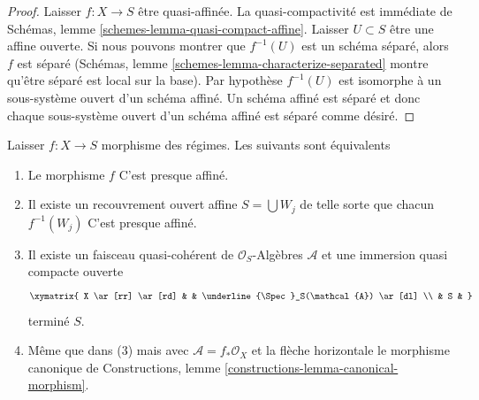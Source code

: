 \begin{proof}
Laisser $f : X \to S$ être quasi-affinée. La quasi-compactivité est immédiate de Schémas, lemme \ref{schemes-lemma-quasi-compact-affine}. Laisser $U \subset S$ être une affine ouverte. Si nous pouvons montrer que $f^{-1}(U)$ est un schéma séparé, alors $f$ est séparé (Schémas, lemme \ref{schemes-lemma-characterize-separated} montre qu'être séparé est local sur la base). Par hypothèse $f^{-1}(U)$ est isomorphe à un sous-système ouvert d'un schéma affiné. Un schéma affiné est séparé et donc chaque sous-système ouvert d'un schéma affiné est séparé comme désiré.
\end{proof}

\begin{lemma}

\label{lemma-characterize-quasi-affine}

Laisser $f : X \to S$ morphisme des régimes. Les suivants sont équivalents

\begin{enumerate}

\item Le morphisme $f$ C'est presque affiné.
\item Il existe un recouvrement ouvert affine $S = \bigcup W_j$
de telle sorte que chacun $f^{-1}(W_j)$ C'est presque affiné.
\item Il existe un faisceau quasi-cohérent de $\mathcal{O}_S$-Algèbres
$\mathcal{A}$ et une immersion quasi compacte ouverte
$$
\xymatrix{
X \ar[rr] \ar[rd] & & \underline{\Spec}_S(\mathcal{A}) \ar[dl] \\
& S &
}
$$
terminé $S$.
\item Même que dans (3) mais avec $\mathcal{A} = f_*\mathcal{O}_X$
et la flèche horizontale le morphisme canonique de Constructions, lemme \ref{constructions-lemma-canonical-morphism}.

\end{enumerate}

\end{lemma}

